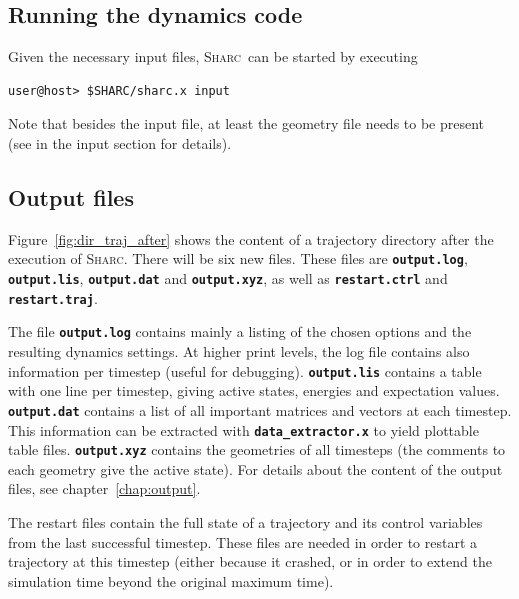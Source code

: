 \documentclass[a4paper,11pt,DIV=15,openany,twoside=false]{scrbook}
\newcommand{\sharc}{\textsc{Sharc}}
\newcommand{\ttt}[1]{\textbf{\texttt{#1}}}
\newenvironment{example}{
  \vspace{0mm}
  \definecolor{shadecolor}{HTML}{BBDDFF}
  \begin{shaded}
  \begin{minipage}{0.9\textwidth}
}{
  \end{minipage}
  \end{shaded}
}
\begin{document}
\subsection{Running the dynamics code}

Given the necessary input files, \sharc\ can be started by executing
\begin{example}
\begin{verbatim}
user@host> $SHARC/sharc.x input
\end{verbatim}
\end{example}
Note that besides the input file, at least the geometry file needs to be present (see in the input section for details).

\subsection{Output files}

Figure~\ref{fig:dir_traj_after} shows the content of a trajectory directory after the execution of \sharc. There will be six new files. These files are \ttt{output.log}, \ttt{output.lis}, \ttt{output.dat} and \ttt{output.xyz}, as well as \ttt{restart.ctrl} and \ttt{restart.traj}.

The file \ttt{output.log} contains mainly a listing of the chosen options and the resulting dynamics settings. At higher print levels, the log file contains also information per timestep (useful for debugging). \ttt{output.lis} contains a table with one line per timestep, giving active states, energies and expectation values. \ttt{output.dat} contains a list of all important matrices and vectors at each timestep. This information can be extracted with \ttt{data\_extractor.x} to yield plottable table files. \ttt{output.xyz} contains the geometries of all timesteps (the comments to each geometry give the active state).
For details about the content of the output files, see chapter~\ref{chap:output}.

The restart files contain the full state of a trajectory and its control variables from the last successful timestep. These files are needed in order to restart a trajectory at this timestep (either because it crashed, or in order to extend the simulation time beyond the original maximum time). 
\end{document}
